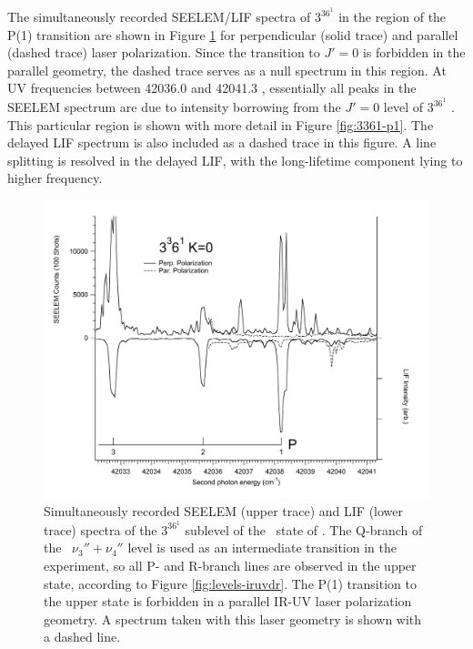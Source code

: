 \documentclass[12pt]{mitthesis}
\begin{document}

The simultaneously recorded SEELEM/LIF spectra of $3^36^1$  in
the region of the P(1) transition are shown in Figure
\ref{fig:3361-p1-polarization} for perpendicular (solid trace) and
parallel (dashed trace) laser polarization.  Since the transition to
$J'=0$ is forbidden in the parallel geometry, the dashed trace serves
as a null spectrum in this region.  At UV frequencies between 42036.0
and 42041.3 \rcm, essentially all peaks in the SEELEM spectrum are due
to intensity borrowing from the $J'=0$ level of $3^36^1$ .  This
particular region is shown with more detail in Figure
\ref{fig:3361-p1}.  The delayed LIF spectrum is also included as a
dashed trace in this figure.  A line splitting is resolved in the
delayed LIF, with the long-lifetime component lying to higher
frequency.


\begin{figure}
  \caption{Simultaneously recorded SEELEM (upper trace) and LIF (lower
    trace) spectra of the $3^36^1$  sublevel of the \astate\
    state of .  The Q-branch of the \xstate\ $\nu_3'' +
    \nu_4''$ level is used as an intermediate transition in the
    experiment, so all P- and R-branch lines are observed in the upper
    state, according to Figure \ref{fig:levels-iruvdr}.  The P(1)
    transition to the upper state is forbidden in a parallel IR-UV
    laser polarization geometry.  A spectrum taken with this laser
    geometry is shown with a dashed line.}
  \label{fig:3361-p1-polarization}
  \centering
  \includegraphics[width=7.3in,angle=90]{spectrum-3361-p1.pdf}
\end{figure}
\end{document}
